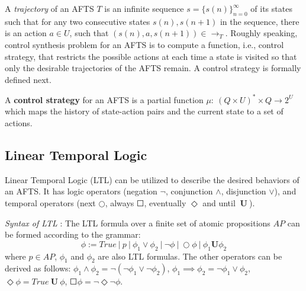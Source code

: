 A \emph{trajectory} of an AFTS $T$ is an infinite sequence $ s = \{s(n)\}_{n=0}^{\infty} $ of its states such that for any two consecutive states $s(n), s(n+1)$ in the sequence, there is an action $a\in U$, such that $(s(n),a,s(n+1))\in \rightarrow_T$. Roughly speaking, control synthesis problem for an AFTS is to compute a function, i.e., control strategy, that restricts the possible actions at each time a state is visited so that only the desirable trajectories of the AFTS remain. A control strategy is formally defined next.

\begin{definition}
	A \textbf{control strategy} for an AFTS is a partial function $ \mu:~(Q\times U)^*\times Q\rightarrow 2^U $ which maps the history of state-action pairs and the current state to a set of actions.
\end{definition}

\subsection{Linear Temporal Logic}

Linear Temporal Logic (LTL) can be utilized to describe the desired behaviors of an AFTS. It has logic operators (negation $ \neg $, conjunction $ \wedge $, disjunction $ \vee $), and temporal operators (next $ \bigcirc $, always $ \Square $, eventually $ \Diamond $ and until $ \mathbf{\ U\ }$).


{\color{teal}\emph{ Syntax of LTL} \cite{baier2008principles}: The LTL formula over a finite set of atomic propositions $ AP $ can be formed according to the grammar:}
\begin{displaymath}
	\phi := True\ \vert\ p\ \vert\ \phi_1 \vee \phi_2\ \vert\ \neg \phi\ \vert\ \bigcirc \phi\ \vert\ \phi_1 \mathbf{U}\phi_2
\end{displaymath}
where $ p\in AP $, $ \phi_1 $ and $ \phi_2 $ are also LTL formulas. The other operators can be derived as follows: $ \phi_1 \wedge \phi_2 = \neg (\neg \phi_1 \vee \neg \phi_2) $, $ \phi_1 \implies \phi_2 = \neg \phi_1 \vee \phi_2 $, $ \Diamond \phi = True \mathbf{\ U\ } \phi $, $ \Square \phi = \neg \Diamond \neg \phi $.


